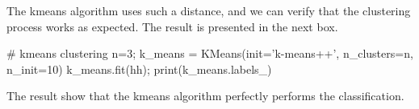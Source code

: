 \vspace*{-10pt}

The kmeans algorithm uses such a distance, and we can verify that the clustering process works as expected. The result is presented in the next box.

\begin{python}
# kmeans clustering
n=3;
k_means = KMeans(init='k-means++', n_clusters=n, n_init=10)
k_means.fit(hh);
print(k_means.labels_)
\end{python}

The result show that the kmeans algorithm perfectly performs the classification.
\begin{sh}
[1 1 1 1 0 0 0 0 2 2 2 2]
\end{sh}


